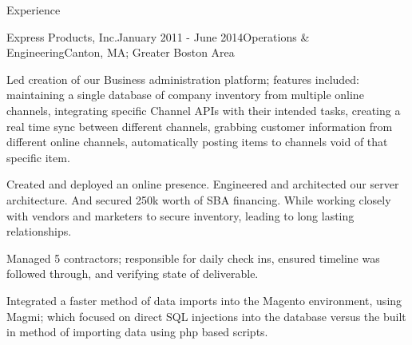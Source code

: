 \documentclass{resume} %
\begin{document}
\begin{rSection}{Experience}
\begin{rSubsection}{Express Products, Inc.}{January 2011 - June 2014}{Operations \& Engineering}{Canton, MA; Greater Boston Area}
\item Led creation of our Business administration platform; features included: maintaining a single database of company inventory from multiple online channels, integrating specific Channel APIs with their intended tasks, creating a real time sync between different channels, grabbing customer information from different online channels, automatically posting items to channels void of that specific item.
 	      \item Created and deployed an online presence. Engineered and architected our server architecture. And secured 250k worth of SBA financing. While working closely with vendors and marketers to secure inventory, leading to long lasting relationships.
 	      \item Managed 5 contractors; responsible for daily check ins, ensured timeline was followed through, and verifying state of deliverable. 
	      
	      \item Integrated a faster method of data imports into the Magento environment, using Magmi; which 
          focused on direct SQL injections into the database versus the built in method of importing data using
           php based scripts.
\end{rSubsection}



\end{rSection}


\end{document}
